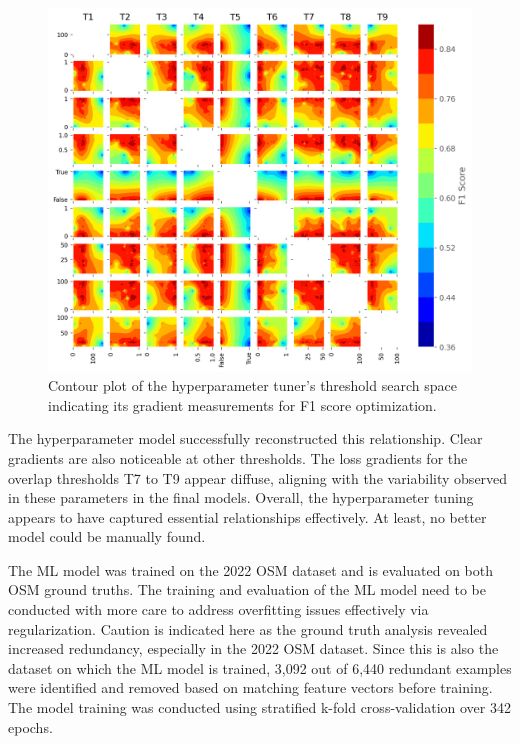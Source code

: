 \begin{figure}[t]
\centering 
\includegraphics[width=\linewidth]{images/matching-hpt-contour-topological-osm-updated.png}
\caption{Contour plot of the hyperparameter tuner's threshold search space indicating its gradient measurements for F1 score optimization.}
\label{fig:hyperparameter-contourplot}
\end{figure}

The hyperparameter model successfully reconstructed this relationship. Clear gradients are also noticeable at other thresholds. The loss gradients for the overlap thresholds T7 to T9 appear diffuse, aligning with the variability observed in these parameters in the final models. Overall, the hyperparameter tuning appears to have captured essential relationships effectively. At least, no better model could be manually found.

The ML model was trained on the 2022 OSM dataset and is evaluated on both OSM ground truths. The training and evaluation of the ML model need to be conducted with more care to address overfitting issues effectively via regularization. Caution is indicated here as the ground truth analysis revealed increased redundancy, especially in the 2022 OSM dataset. Since this is also the dataset on which the ML model is trained, 3,092 out of 6,440 redundant examples were identified and removed based on matching feature vectors before training. The model training was conducted using stratified k-fold cross-validation over 342 epochs.

